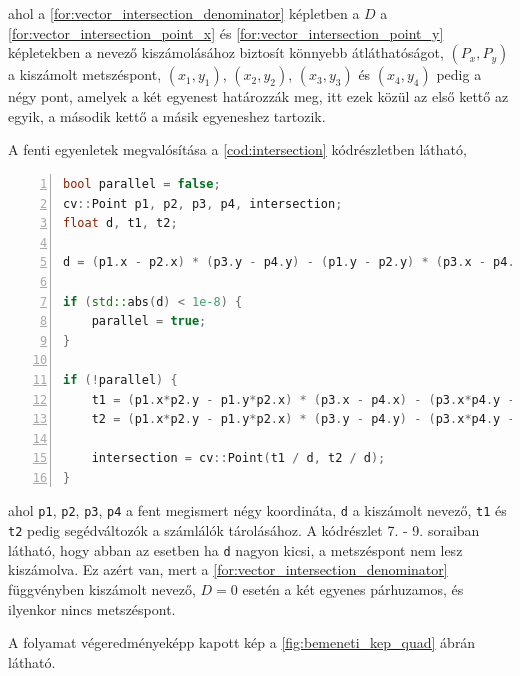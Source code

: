\par ahol a \ref{for:vector_intersection_denominator} képletben a $D$ a \ref{for:vector_intersection_point_x} és \ref{for:vector_intersection_point_y} képletekben a nevező kiszámolásához biztosít könnyebb átláthatóságot, $(P_x, P_y)$ a kiszámolt metszéspont, $(x_1, y_1)$, $(x_2, y_2)$, $(x_3, y_3)$ és $(x_4, y_4)$ pedig a négy pont, amelyek a két egyenest határozzák meg, itt ezek közül az első kettő az egyik, a második kettő a másik egyeneshez tartozik.
\par A fenti egyenletek megvalósítása a \ref{cod:intersection} kódrészletben látható,

\begin{codewrapper}
\begin{lstlisting}[language=C++, numbers=left, caption={Metszéspont kereső algoritmus.}, label={cod:intersection}]
bool parallel = false;
cv::Point p1, p2, p3, p4, intersection;
float d, t1, t2;

d = (p1.x - p2.x) * (p3.y - p4.y) - (p1.y - p2.y) * (p3.x - p4.x);

if (std::abs(d) < 1e-8) {
    parallel = true;
}

if (!parallel) {
    t1 = (p1.x*p2.y - p1.y*p2.x) * (p3.x - p4.x) - (p3.x*p4.y - p3.y*p4.x) * (p1.x - p2.x);
    t2 = (p1.x*p2.y - p1.y*p2.x) * (p3.y - p4.y) - (p3.x*p4.y - p3.y*p4.x) * (p1.y - p2.y);
    
    intersection = cv::Point(t1 / d, t2 / d);
}
\end{lstlisting}
\end{codewrapper}

\par ahol \lstinline{p1}, \lstinline{p2}, \lstinline{p3}, \lstinline{p4} a fent megismert négy koordináta, \lstinline{d} a kiszámolt nevező, \lstinline{t1} és \lstinline{t2} pedig segédváltozók a számlálók tárolásához. A kódrészlet 7. - 9. soraiban látható, hogy abban az esetben ha \lstinline{d} nagyon kicsi, a metszéspont nem lesz kiszámolva. Ez azért van, mert a \ref{for:vector_intersection_denominator} függvényben kiszámolt nevező, $D = 0$ esetén a két egyenes párhuzamos, és ilyenkor nincs metszéspont.
\par A folyamat végeredményeképp kapott kép a \ref{fig:bemeneti_kep_quad} ábrán látható.

